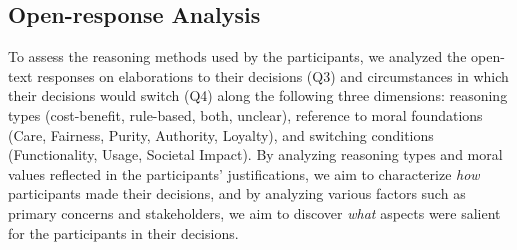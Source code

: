 \subsection{Open-response Analysis}
\label{ssec:text-analysis}
To assess the reasoning methods used by the participants, we analyzed the open-text responses on elaborations to their decisions (Q3) and circumstances in which their decisions would switch (Q4) along the following three dimensions: reasoning types (cost-benefit, rule-based, both, unclear), reference to moral foundations (Care, Fairness, Purity, Authority, Loyalty), and switching conditions (Functionality, Usage, Societal Impact). By analyzing reasoning types and moral values reflected in the participants' justifications, we aim to characterize \emph{how} participants made their decisions, and by analyzing various factors such as primary concerns and stakeholders, we aim to discover \emph{what} aspects were salient for the participants in their decisions. 



